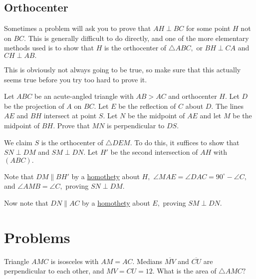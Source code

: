 \documentclass[blue,onecol]{shooting}
\begin{document}
\subsection{Orthocenter}
Sometimes a problem will ask you to prove that $AH\perp BC$ for some point $H$ not on $BC.$ This is generally difficult to do directly, and one of the more elementary methods used is to show that $H$ is the orthocenter of $\triangle ABC,$ or $BH\perp CA$ and $CH\perp AB.$

This is obviously not always going to be true, so make sure that this actually seems true before you try too hard to prove it.

\begin{exam}
Let $ABC$ be an acute-angled triangle with $AB> AC$ and orthocenter $H$. Let $D$ be the projection of $A$ on $BC$. Let $E$ be the reflection of $C$ about $D$. The lines $AE$ and $BH$ intersect at point $S$. Let $N$ be the midpoint of $AE$ and let $M$ be the midpoint of $BH$. Prove that $MN$ is perpendicular to $DS$.
\end{exam}

\begin{sol}
We claim $S$ is the orthocenter of $\triangle DEM.$ To do this, it suffices to show that $SN\perp DM$ and $SM\perp DN.$ Let $H'$ be the second intersection of $AH$ with $(ABC).$

Note that $DM\parallel BH'$ by a \hyperref[section:homothety]{homothety} about $H,$ $\angle MAE=\angle DAC=90^{\circ}-\angle C,$ and $\angle AMB=\angle C,$ proving $SN\perp DM.$

Now note that $DN\parallel AC$ by a \hyperref[section:homothety]{homothety} about $E,$ proving $SM\perp DN.$
\end{sol}

\pagebreak

\section{Problems}



\begin{prob}[AMC 10A 2020/12]{2}
Triangle $AMC$ is isosceles with $AM = AC$. Medians $\overline{MV}$ and $\overline{CU}$ are perpendicular to each other, and $MV=CU=12$. What is the area of $\triangle AMC?$
\end{prob}
\end{document}
